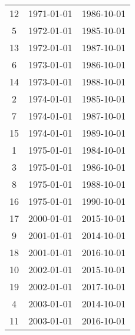 % 
\begin{tabular}{ccc}
  \hline
  \hline
12 & 1971-01-01 & 1986-10-01 \\ 
  5 & 1972-01-01 & 1985-10-01 \\ 
  13 & 1972-01-01 & 1987-10-01 \\ 
  6 & 1973-01-01 & 1986-10-01 \\ 
  14 & 1973-01-01 & 1988-10-01 \\ 
  2 & 1974-01-01 & 1985-10-01 \\ 
  7 & 1974-01-01 & 1987-10-01 \\ 
  15 & 1974-01-01 & 1989-10-01 \\ 
  1 & 1975-01-01 & 1984-10-01 \\ 
  3 & 1975-01-01 & 1986-10-01 \\ 
  8 & 1975-01-01 & 1988-10-01 \\ 
  16 & 1975-01-01 & 1990-10-01 \\ 
  17 & 2000-01-01 & 2015-10-01 \\ 
  9 & 2001-01-01 & 2014-10-01 \\ 
  18 & 2001-01-01 & 2016-10-01 \\ 
  10 & 2002-01-01 & 2015-10-01 \\ 
  19 & 2002-01-01 & 2017-10-01 \\ 
  4 & 2003-01-01 & 2014-10-01 \\ 
  11 & 2003-01-01 & 2016-10-01 \\ 
   \hline
\end{tabular}
